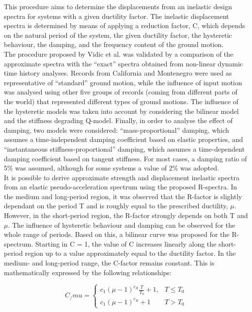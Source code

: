 This procedure aims to determine the displacements from an inelastic design spectra for systems with a given ductility factor. The inelastic displacement spectra is determined by means of applying a reduction factor,  C, which depends on the natural period of the system, the given ductility factor, the hysteretic behaviour, the damping, and the frequency content of the ground motion.\\

The procedure proposed by Vidic et al. was validated by a comparison of the approximate spectra with the “exact” spectra obtained from non-linear dynamic time history analyses. Records from California and Montenegro were used as representative of “standard” ground motion, while the influence of input motion was analysed using other five groups of records (coming from different parts of the world) that represented different types of ground motions. The influence of the hysteretic models was taken into account by considering the bilinear model and the stiffness degrading Q-model. Finally, in order to analyse the effect of damping, two models were considered: “mass-proportional” damping, which assumes a time-independent damping coefficient based on elastic properties, and “instantaneous stiffness-proportional” damping, which assumes a time-dependent damping coefficient based on tangent stiffness. For most cases, a damping ratio of 5\% was assumed, although for some systems a value of 2\% was adopted.\\

It is possible to derive approximate strength and displacement inelastic spectra from an elastic pseudo-acceleration spectrum using the proposed R-spectra. In the medium and long-period region, it was observed that the R-factor is slightly dependant on the period T and is roughly equal to the prescribed ductility, $\mu$. However, in the short-period region, the R-factor strongly depends on both T and $\mu$. The influence of hysteretic behaviour and damping can be observed for the whole range of periods. Based on this, a bilinear curve was proposed for the R-spectrum. Starting in C = 1, the value of C increases linearly along the short-period region up to a value approximately equal to the ductility factor. In the medium- and long-period range, the C-factor remains constant. This is mathematically expressed by the following relationships:


\begin{equation}
C_/mu = \left\{
\begin{matrix}
  c_{1}\left(\mu-1\right)^{c_{R}}\frac{T}{T_{0}} + 1, & T\leq T_{0}  \\
  c_{1}\left(\mu-1\right)^{c_{R}} + 1 & T>T_{0}
 \end{matrix}
 \right.
\end{equation} 

